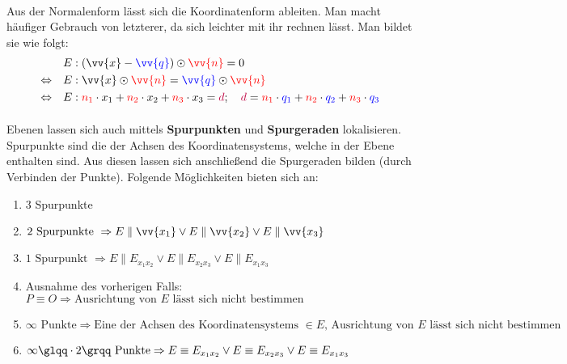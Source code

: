         \paragraph{} Aus der Normalenform lässt sich die Koordinatenform ableiten. Man macht häufiger Gebrauch von letzterer, da sich leichter
        mit ihr rechnen lässt. Man bildet sie wie folgt:
        \begin{align*}
                                  &E:(\vv{x} - \textcolor{blue}{\vv{q}}) \odot \textcolor{red}{\vv{n}} = 0 \\
            \Leftrightarrow \quad &E:\vv{x} \odot \textcolor{red}{\vv{n}} = \textcolor{blue}{\vv{q}} \odot \textcolor{red}{\vv{n}} \\
            \Leftrightarrow \quad &E:\textcolor{red}{n_1} \cdot x_1 + \textcolor{red}{n_2} \cdot x_2 + \textcolor{red}{n_3} \cdot x_3 = \textcolor{purple}{d} ; \quad \textcolor{purple}{d} = \textcolor{red}{n_1} \cdot \textcolor{blue}{q_1} + \textcolor{red}{n_2} \cdot \textcolor{blue}{q_2} + \textcolor{red}{n_3} \cdot \textcolor{blue}{q_3}
        \end{align*}

        \begin{Bemerkung}
            \paragraph{} Ebenen lassen sich auch mittels \textbf{Spurpunkten} und \textbf{Spurgeraden} lokalisieren. Spurpunkte sind die
            der Achsen des Koordinatensystems, welche in der Ebene enthalten sind. Aus diesen lassen sich anschließend die Spurgeraden bilden
            (durch Verbinden der Punkte). Folgende Möglichkeiten bieten sich an:
            \begin{enumerate}[1)]
                \item 3 Spurpunkte
                \item $\text{2 Spurpunkte } \Rightarrow E \parallel \vv{x_1} \lor E \parallel \vv{x_2} \lor E \parallel \vv{x_3}$
                \item $\text{1 Spurpunkt } \Rightarrow E \parallel E_{x_{1}x_2} \lor E \parallel E_{x_{2}x_3} \lor E \parallel E_{x_{1}x_3}$
                \item Ausnahme des vorherigen Falls: $P \equiv O \Rightarrow \text{Ausrichtung von $E$ lässt sich nicht bestimmen}$
                \item $\infty \text{ Punkte} \Rightarrow \text{Eine der Achsen des Koordinatensystems $\in E$, Ausrichtung von $E$ lässt sich nicht bestimmen}$
                \item $\infty \glqq \cdot 2 \grqq \text{ Punkte} \Rightarrow E \equiv E_{x_{1}x_2} \lor E \equiv E_{x_{2}x_3} \lor E \equiv E_{x_{1}x_3}$
            \end{enumerate}
        \end{Bemerkung}

